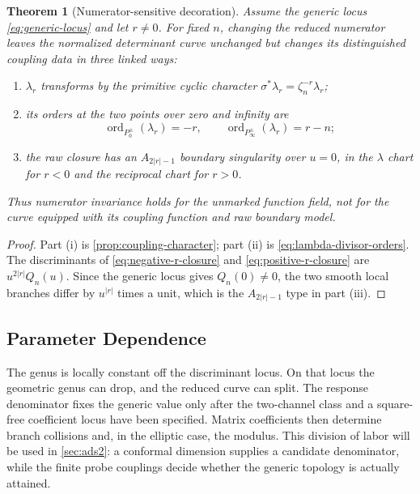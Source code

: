 \documentclass[11pt,reqno]{amsart}
\newtheorem{theorem}{Theorem}[section]
\theoremstyle{remark}
\begin{document}
\begin{theorem}[Numerator-sensitive decoration]
\label{thm:numerator-decoration}
Assume the generic locus \eqref{eq:generic-locus} and let $r\ne0$.  For fixed
$n$, changing the reduced numerator leaves the normalized determinant curve
unchanged but changes its distinguished coupling data in three linked ways:
\begin{enumerate}[label=\textnormal{(\roman*)}]
\item $\lambda_r$ transforms by the primitive cyclic character
$\sigma^*\lambda_r=\zeta_n^{-r}\lambda_r$;
\item its orders at the two points over zero and infinity are
\begin{equation}\label{eq:decoration-orders}
 \operatorname{ord}_{P_0^\pm}(\lambda_r)=-r,
 \qquad
 \operatorname{ord}_{P_\infty^\pm}(\lambda_r)=r-n;
\end{equation}
\item the raw closure has an $A_{2|r|-1}$ boundary singularity over $u=0$,
in the $\lambda$ chart for $r<0$ and the reciprocal chart for $r>0$.
\end{enumerate}
Thus numerator invariance holds for the unmarked function field, not for the
curve equipped with its coupling function and raw boundary model.
\end{theorem}

\begin{proof}
Part (i) is \cref{prop:coupling-character}; part (ii) is
\eqref{eq:lambda-divisor-orders}.  The discriminants of
\eqref{eq:negative-r-closure} and \eqref{eq:positive-r-closure} are
$u^{2|r|}Q_n(u)$.  Since the generic locus gives $Q_n(0)\ne0$, the two smooth
local branches differ by $u^{|r|}$ times a unit, which is the
$A_{2|r|-1}$ type in part (iii).
\end{proof}

\subsection{Parameter Dependence}

The genus is locally constant off the discriminant locus.  On that locus the
geometric genus can drop, and the reduced curve can split.  The response
denominator fixes the generic value only after the two-channel class and a
square-free coefficient locus have been specified.
Matrix coefficients then determine branch collisions and, in the elliptic
case, the modulus.  This division of labor will be used in
\cref{sec:ads2}: a conformal dimension supplies a candidate denominator,
while the finite probe couplings decide whether the generic topology is
actually attained.
\end{document}
